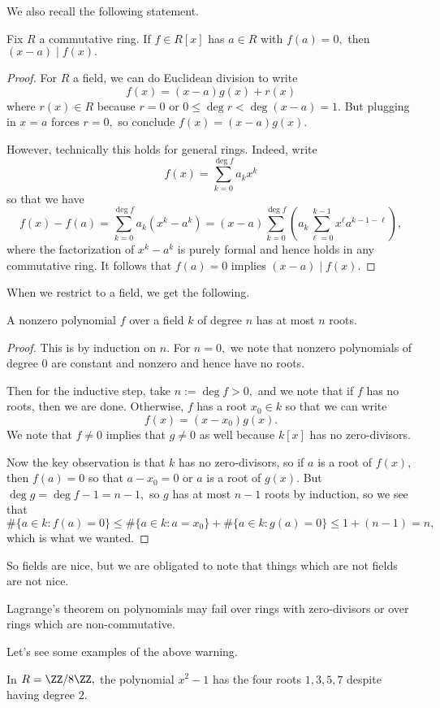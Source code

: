 We also recall the following statement.
\begin{lemma}
	Fix $R$ a commutative ring. If $f\in R[x]$ has $a\in R$ with $f(a)=0,$ then $(x-a)\mid f(x).$
\end{lemma}
\begin{proof}
	For $R$ a field, we can do Euclidean division to write
	\[f(x)=(x-a)g(x)+r(x)\]
	where $r(x)\in R$ because $r=0$ or $0\le\deg r<\deg(x-a)=1.$ But plugging in $x=a$ forces $r=0,$ so conclude $f(x)=(x-a)g(x).$

	However, technically this holds for general rings. Indeed, write
	\[f(x)=\sum_{k=0}^{\deg f}a_kx^k\]
	so that we have
	\[f(x)-f(a)=\sum_{k=0}^{\deg f}a_k\left(x^k-a^k\right)=(x-a)\sum_{k=0}^{\deg f}\left(a_k\sum_{\ell=0}^{k-1}x^\ell a^{k-1-\ell}\right),\]
	where the factorization of $x^k-a^k$ is purely formal and hence holds in any commutative ring. It follows that $f(a)=0$ implies $(x-a)\mid f(x).$
\end{proof}
When we restrict to a field, we get the following.
\begin{proposition}[Lagrange]
	A nonzero polynomial $f$ over a field $k$ of degree $n$ has at most $n$ roots.
\end{proposition}
\begin{proof}
	This is by induction on $n.$ For $n=0,$ we note that nonzero polynomials of degree $0$ are constant and nonzero and hence have no roots.
	
	Then for the inductive step, take $n:=\deg f>0,$ and we note that if $f$ has no roots, then we are done. Otherwise, $f$ has a root $x_0\in k$ so that we can write
	\[f(x)=(x-x_0)g(x).\]
	We note that $f\ne0$ implies that $g\ne0$ as well because $k[x]$ has no zero-divisors.
	
	Now the key observation is that $k$ has no zero-divisors, so if $a$ is a root of $f(x),$ then $f(a)=0$ so that $a-x_0=0$ or $a$ is a root of $g(x).$ But $\deg g=\deg f-1=n-1,$ so $g$ has at most $n-1$ roots by induction, so we see that
	\[\#\{a\in k:f(a)=0\}\le\#\{a\in k:a=x_0\}+\#\{a\in k:g(a)=0\}\le1+(n-1)=n,\]
	which is what we wanted.
\end{proof}
So fields are nice, but we are obligated to note that things which are not fields are not nice.
\begin{warn}
	Lagrange's theorem on polynomials may fail over rings with zero-divisors or over rings which are non-commutative.
\end{warn}
Let's see some examples of the above warning.
\begin{example}
	In $R=\ZZ/8\ZZ,$ the polynomial $x^2-1$ has the four roots $1,3,5,7$ despite having degree $2.$
\end{example}
